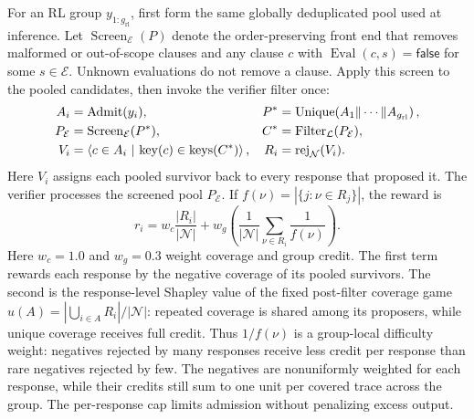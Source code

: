 For an RL group \(y_{1:g_{\mathrm{rl}}}\), first form the same globally
deduplicated pool used at inference. Let
\(\operatorname{Screen}_{\mathcal E}(P)\) denote the order-preserving
front end that removes malformed or out-of-scope clauses and any clause
\(c\) with \(\operatorname{Eval}(c,s)=\mathsf{false}\) for some
\(s\in\mathcal E\). Unknown evaluations do not remove a clause.
Apply this screen to the pooled candidates, then invoke the verifier filter once:
\begin{align}
  A_i&=\operatorname{Admit}(y_i),
  &P^*&=\operatorname{Unique}\!\left(A_1\Vert\cdots\Vert A_{g_{\mathrm{rl}}}\right),
  \label{eq:formal-pooled-filter}\\
  P_{\mathcal E}&=\operatorname{Screen}_{\mathcal E}(P^*),
  &C^*&=\operatorname{Filter}_{\mathcal L}(P_{\mathcal E}),\notag\\
  V_i&=\left\langle c\in A_i\ \middle|\
    \operatorname{key}(c)\in\operatorname{keys}(C^*)\right\rangle,
  &R_i&=\operatorname{rej}_{\mathcal N}(V_i).
  \label{eq:formal-projection}
\end{align}
Here \(V_i\) assigns each pooled survivor back to every response that proposed
it. The verifier processes the screened pool \(P_{\mathcal E}\). If
\(f(\nu)=|\{j:\nu\in R_j\}|\), the reward is
\begin{equation}
  r_i=w_c\frac{|R_i|}{|\mathcal N|}
      +w_g\left(
        \frac{1}{|\mathcal N|}\sum_{\nu\in R_i}\frac{1}{f(\nu)}
      \right).
  \label{eq:formal-reward}
\end{equation}
Here \(w_c=1.0\) and \(w_g=0.3\) weight coverage and group credit.  The first term rewards each response by the negative coverage of
its pooled survivors.  The second is the response-level Shapley value of the
fixed post-filter coverage game
\(u(A)=|\bigcup_{i\in A}R_i|/|\mathcal N|\): repeated coverage is shared among
its proposers, while unique coverage receives full credit.  Thus
\(1/f(\nu)\) is a group-local difficulty weight: negatives rejected by many
responses receive less credit per response than rare negatives rejected by
few.  The negatives are nonuniformly weighted for each response, while their
credits still sum to one unit per covered trace across the group.
The per-response cap limits admission without penalizing
excess output.

